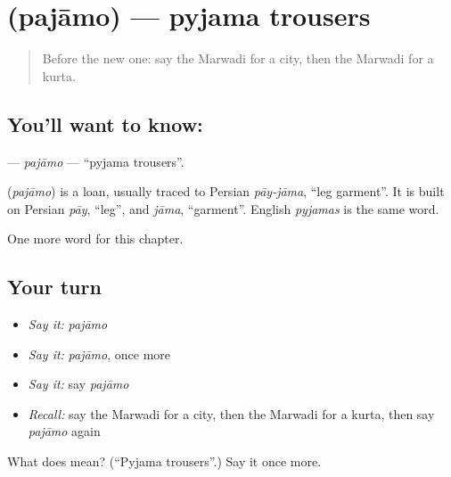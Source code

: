 \section[\texorpdfstring{\mw{पजामो} (pajāmo)}{पजामो (pajāmo)}]{ (pajāmo) — pyjama trousers}

\label{lesson:MW-C84-pajamo}



\begin{quote}
Before the new one: say the Marwadi for a city, then the Marwadi for a kurta.
\end{quote}

\subsection*{You'll want to know: }
\textbf{} — \emph{pajāmo} — \textquotedblleft{}pyjama trousers\textquotedblright{}.

\begin{cousinweb}
\textbf{} (\emph{pajāmo}) is a loan, usually traced to Persian \emph{pāy-jāma}, \textquotedblleft{}leg garment\textquotedblright{}. It is built on Persian \emph{pāy}, \textquotedblleft{}leg\textquotedblright{}, and \emph{jāma}, \textquotedblleft{}garment\textquotedblright{}. English \emph{pyjamas} is the same word.
\end{cousinweb}

\begin{grammarlens}[title={What you've built}]
One more word for this chapter.
\end{grammarlens}

\subsection*{Your turn}
\begin{itemize}
\raggedright
  \item \emph{Say it:} \emph{pajāmo}
  \item \emph{Say it:} \emph{pajāmo}, once more
  \item \emph{Say it:} say \emph{pajāmo}
  \item \emph{Recall:} say the Marwadi for a city, then the Marwadi for a kurta, then say \emph{pajāmo} again
\end{itemize}

\begin{tcolorbox}[breakable,colback=teal!4,colframe=teal!35!black,title={Before you move on}]
What does  mean? (\textquotedblleft{}Pyjama trousers\textquotedblright{}.) Say it once more.
\end{tcolorbox}
